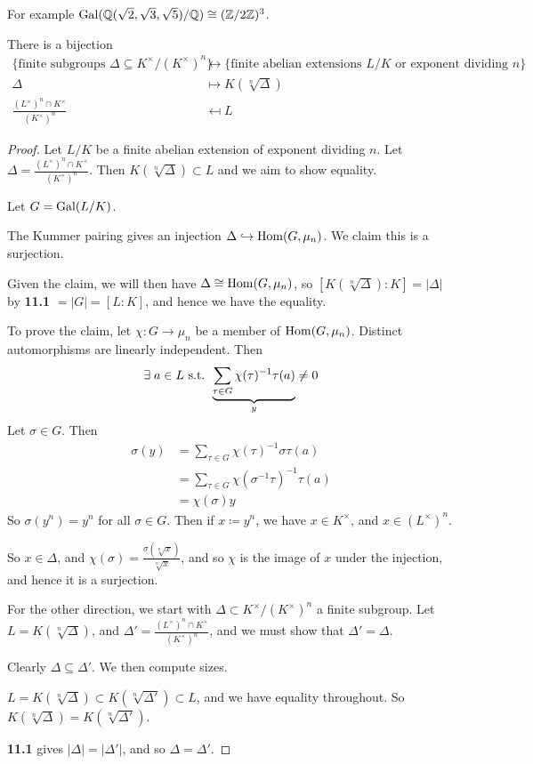 \documentclass[10pt,a4paper]{article}
\begin{document}
For example $\operatorname{Gal}(\mathbb{Q}(\sqrt{2}, \sqrt{3}, \sqrt{5})/\mathbb{Q}) \cong (\mathbb{Z}/2\mathbb{Z})^3$.
\begin{theorem}
  There is a bijection
  \begin{align*}
    \{\text{finite subgroups }\Delta \subseteq K^\times/(K^\times)^n\} &\leftrightarrow \{\text{finite abelian extensions }L/K\text{ or exponent dividing $n$}\}\\
    \Delta &\mapsto K(\sqrt[n]{\Delta})\\
    \frac{(L^\times)^n \cap K^\times}{(K^\times)^n} &\mapsfrom L
  \end{align*}
\end{theorem}
\begin{proof}
  Let $L/K$ be a finite abelian extension of exponent dividing $n$. Let $\Delta = \frac{(L^\times)^n \cap K^\times}{(K^\times)^n}$. Then $K(\sqrt[n]{\Delta}) \subset L$ and we aim to show equality.

  Let $G = \operatorname{Gal}(L/K)$.

  The Kummer pairing gives an injection $\Delta \hookrightarrow \operatorname{Hom}(G, \mu_n)$. We claim this is a surjection.

  Given the claim, we will then have $\Delta \cong \operatorname{Hom}(G, \mu_n)$, so $[K(\sqrt[n]{\Delta}):K] = |\Delta|$ by \textbf{11.1} $= |G| = [L:K]$, and hence we have the equality.

  To prove the claim, let $\chi:G \to \mu_n$ be a member of $\operatorname{Hom}(G, \mu_n)$. Distinct automorphisms are linearly independent. Then
  \[\exists a \in L \st \underbrace{\sum_{\tau \in G} \chi(\tau)^{-1} \tau(a)}_y \neq 0\]
  Let $\sigma \in G$. Then
  \begin{align*}
    \sigma(y) &= \sum_{\tau \in G} \chi(\tau)^{-1}\sigma\tau(a)\\
    &= \sum_{\tau\in G}\chi(\sigma^{-1}\tau)^{-1}\tau(a)\\
    &= \chi(\sigma)y
  \end{align*}
  So $\sigma(y^n) = y^n$ for all $\sigma \in G$. Then if $x \coloneqq y^n$, we have $x \in K^\times$, and $x \in (L^\times)^n$.

  So $x \in \Delta$, and $\chi(\sigma) = \frac{\sigma(\sqrt[n]{x})}{\sqrt[n]{x}}$, and so $\chi$ is the image of $x$ under the injection, and hence it is a surjection.

  For the other direction, we start with $\Delta \subset K^\times/(K^\times)^n$ a finite subgroup. Let $L = K(\sqrt[n]{\Delta})$, and $\Delta' = \frac{(L^\times)^n\cap K^\times}{(K^\times)^n}$, and we must show that $\Delta' = \Delta$.

  Clearly $\Delta \subseteq \Delta'$. We then compute sizes.

  $L = K(\sqrt[n]{\Delta}) \subset K(\sqrt[n]{\Delta'}) \subset L$, and we have equality throughout. So $K(\sqrt[n]{\Delta}) = K(\sqrt[n]{\Delta'})$.

  \textbf{11.1} gives $|\Delta| = |\Delta'|$, and so $\Delta = \Delta'$.
\end{proof}
\end{document}
